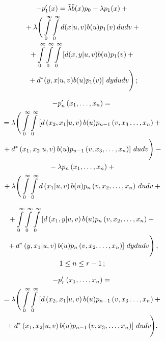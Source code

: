 \begin{multicols}{2}
\noindent
\begin{multline}
\label{e3.1-mei}
-p'_1(x) = \tilde\lambda \tilde b(x) p_0 - \lambda p_1(x)
+ {}\\[-1pt]
{}+\lambda \Bigg( \int\limits_0^\infty \int\limits_0^\infty
d(x|u,v) b(u) p_1(v) \,dudv +{}
\\[-1pt]
{}+ \int\limits_0^\infty \int\limits_0^\infty
\int\limits_0^\infty \left[d(x,y|u,v) b(u) p_1(v)  +{}\right.\\[-1pt]
\left.{}+
d^*(y,x|u,v) b(u) p_1(v)\right] \,dydudv
\Bigg)\,;
\end{multline}

\vspace*{-16pt}

\noindent
\begin{multline*}
-p'_{n}\left(x_1,\ldots,x_n\right) ={}
\\
{}=
\lambda \Bigg(
\int\limits_0^\infty \int\limits_0^\infty
\left[d\left(x_2,x_1|u,v\right) b(u) p_{n-1}\left(v,x_3\ldots,x_n\right)
+ {}\right.\\
\left.{}+
d^*\left(x_1,x_2|u,v\right) b(u) p_{n-1}\left(v,x_3,\ldots,x_n\right)\right]
\,dudv \Bigg)
-{}\\
{}-
\lambda p_{n}\left(x_1,\ldots,x_n\right)
+{}\\
{}+ \lambda \Bigg(
\int\limits_0^\infty \int\limits_0^\infty
d\left(x_1|u,v\right) b(u) p_{n}\left(v,x_2,\ldots,x_n\right)
\,dudv +{}
\end{multline*}

\noindent
\begin{multline}
{}+
\int\limits_0^\infty \int\limits_0^\infty
\int\limits_0^\infty \left[d\left(x_1,y|u,v\right) b(u) p_{n}\left(v,x_2,\ldots,x_n\right)
+{}\right.
\\
\left.{}+
d^*\left(y,x_1|u,v\right) b(u) p_{n}\left(v,x_2,\ldots,x_n\right)\right]
\,dy du dv \Bigg)\,,
\\
 1 \le n \le r-1\,;
 \label{e3.2-mei}
\end{multline}

\vspace*{-12pt}

\noindent
\begin{multline}
\label{e3.3-mei}
-p'_{r}\left(x_1,\ldots,x_n\right) ={}\\
{}=
\lambda \Bigg(
\int\limits_0^\infty \int\limits_0^\infty
\left[d\left(x_2,x_1|u,v\right) b(u) p_{n-1}\left(v,x_3\ldots,x_n\right)
+{}\right.
\\
\!\!\!\!\left.{}+
d^*\left(x_1,x_2|u,v\right) b(u) p_{n-1}\left(v,x_3,\ldots,x_n\right)\right]
\,du dv \!\Bigg).\!\!
\end{multline}


\end{multicols}
